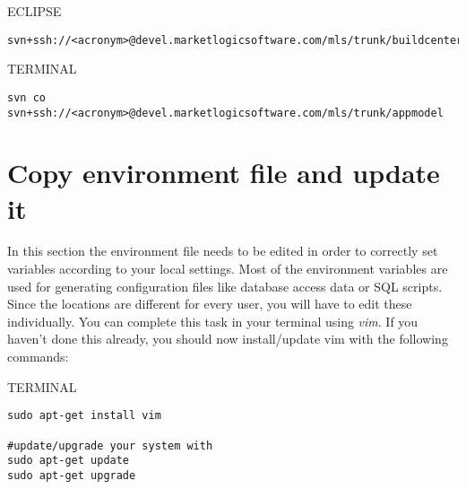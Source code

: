 \documentclass[10pt,a4paper]{article}
\begin{document}
\begin{command}{ECLIPSE}

\noindent
{} %
\begin{lstlisting}
svn+ssh://<acronym>@devel.marketlogicsoftware.com/mls/trunk/buildcenter
\end{lstlisting}
\end{command}

\vspace{\baselineskip}

\begin{command}{TERMINAL}

\begin{lstlisting}
svn co svn+ssh://<acronym>@devel.marketlogicsoftware.com/mls/trunk/appmodel 
\end{lstlisting}
\end{command}

\newpage
\section{Copy environment file and update it}
In this section the environment file needs to be edited in order to correctly set variables according to your local settings. Most of the environment variables are used for generating configuration files like database access data or SQL scripts. Since the locations are different for every user, you will have to edit these individually. You can complete this task in your terminal using \textit{vim}. If you haven't done this already, you should now install/update vim with the following commands:

\begin{command}{TERMINAL}
\begin{lstlisting}
sudo apt-get install vim

#update/upgrade your system with
sudo apt-get update
sudo apt-get upgrade
\end{lstlisting} %
\end{command}

\vspace{\baselineskip}
\end{document}
